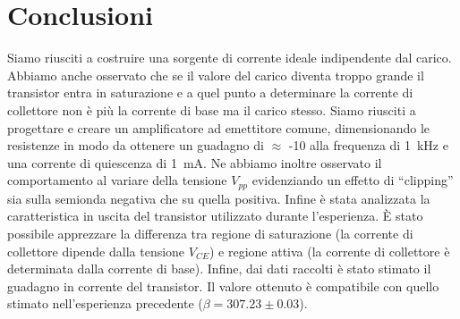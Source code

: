 \section{Conclusioni}
Siamo riusciti a costruire una sorgente di corrente ideale indipendente dal carico.
Abbiamo anche osservato che se il valore del carico diventa troppo grande il transistor entra in saturazione e a quel punto a determinare la corrente di collettore non è più la corrente di base ma il carico stesso.
Siamo riusciti a progettare e creare un amplificatore ad emettitore comune, dimensionando le resistenze in modo da ottenere un guadagno di $\approx$ -10 alla frequenza di \SI{1}{\kilo\hertz} e una corrente di quiescenza di \SI{1}{\milli\ampere}.
Ne abbiamo inoltre osservato il comportamento al variare della tensione $V_{pp}$ evidenziando un effetto di ``clipping'' sia sulla semionda negativa che su quella positiva. 
Infine è stata analizzata la caratteristica in uscita del transistor utilizzato durante l'esperienza.
È stato possibile apprezzare la differenza tra regione di saturazione (la corrente di collettore dipende dalla tensione $V_{CE}$) e regione attiva (la corrente di collettore è determinata dalla corrente di base).
Infine, dai dati  raccolti è stato stimato il guadagno in corrente del transistor. Il valore ottenuto è compatibile con quello stimato nell'esperienza precedente ($\beta = 307.23 \pm 0.03 $).
